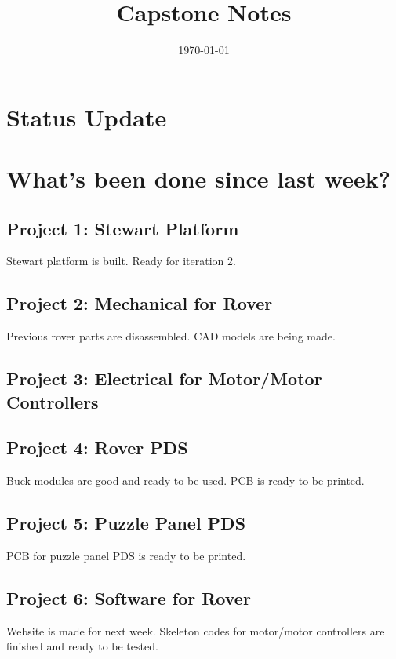 \documentclass[a4paper, 10pt]{article}
\title{Capstone Notes}
\date{\today}
\begin{document}
\maketitle

\section*{Status Update}



\section*{What's been done since last week?}
	\subsection*{Project 1: Stewart Platform}
	Stewart platform is built. Ready for iteration 2.
		
	\subsection*{Project 2: Mechanical for Rover}
	Previous rover parts are disassembled. CAD models are being made.
	
	\subsection*{Project 3: Electrical for Motor/Motor Controllers}
	
		
	\subsection*{Project 4: Rover PDS}	
	Buck modules are good and ready to be used. PCB is ready to be printed.
		
	\subsection*{Project 5: Puzzle Panel PDS}
	PCB for puzzle panel PDS is ready to be printed.
		
	\subsection*{Project 6: Software for Rover}
	Website is made for next week. Skeleton codes for motor/motor controllers are finished and ready to be tested.
		
\end{document}
